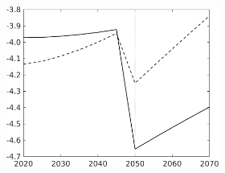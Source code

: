 \begin{figure}[h!!!]
\begin{subfigure}[]{1\textwidth}
\begin{subfigure}[]{0.4\textwidth}
			\includegraphics[width=1\textwidth]{../../codding_model/own_basedOnFried/optimalPol_010922_revision/figures/all_13Sept22_Tplus30/Hagg_PercentageLFDyn_Target_regime4_knspil1_spillover0_noskill0_sep0_xgrowth0_PV1_etaa0.79_lgd0.png}
		\end{subfigure}
	\end{subfigure}
	

\end{figure}

